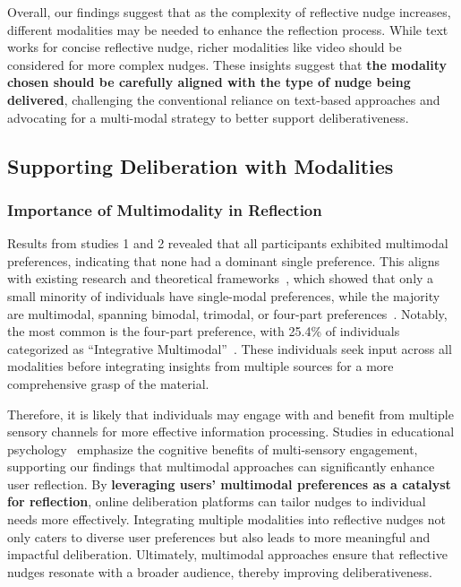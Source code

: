 Overall, our findings suggest that as the complexity of reflective nudge increases, different modalities may be needed to enhance the reflection process. While text works for concise reflective nudge, richer modalities like video should be considered for more complex nudges. These insights suggest that \textbf{the modality chosen should be carefully aligned with the type of nudge being delivered}, challenging the conventional reliance on text-based approaches and advocating for a multi-modal strategy to better support deliberativeness.

\subsection{Supporting Deliberation with Modalities}

\subsubsection{Importance of Multimodality in Reflection}
Results from studies 1 and 2 revealed that all participants exhibited multimodal preferences, indicating that none had a dominant single preference. This aligns with existing research and theoretical frameworks~\cite{mayer2002multimedia, fleming1992not}, which showed that only a small minority of individuals have single-modal preferences, while the majority are multimodal, spanning bimodal, trimodal, or four-part preferences~\cite{mayer2005cognitive, varklearnVARKResearchWhat}. Notably, the most common is the four-part preference, with 25.4\% of individuals categorized as ``Integrative Multimodal''~\cite{varklearnVARKResearchWhat}. These individuals seek input across all modalities before integrating insights from multiple sources for a more comprehensive grasp of the material. 

Therefore, it is likely that individuals may engage with and benefit from multiple sensory channels for more effective information processing. Studies in educational psychology~\cite{mayer2005cambridge, mayer2002multimedia, fleming1992not, clark2023learning} emphasize the cognitive benefits of multi-sensory engagement, supporting our findings that multimodal approaches can significantly enhance user reflection. By \textbf{leveraging users' multimodal preferences as a catalyst for reflection}, online deliberation platforms can tailor nudges to individual needs more effectively. Integrating multiple modalities into reflective nudges not only caters to diverse user preferences but also leads to more meaningful and impactful deliberation. Ultimately, multimodal approaches ensure that reflective nudges resonate with a broader audience, thereby improving deliberativeness.

